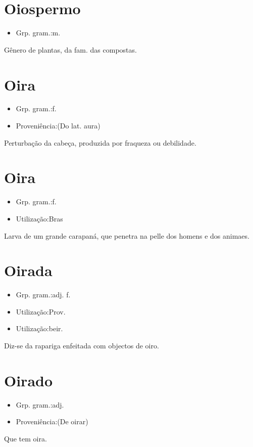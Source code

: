 \section{Oiospermo}
\begin{itemize}
\item {Grp. gram.:m.}
\end{itemize}
Gênero de plantas, da fam. das compostas.
\section{Oira}
\begin{itemize}
\item {Grp. gram.:f.}
\end{itemize}
\begin{itemize}
\item {Proveniência:(Do lat. \textunderscore aura\textunderscore )}
\end{itemize}
Perturbação da cabeça, produzida por fraqueza ou debilidade.
\section{Oira}
\begin{itemize}
\item {Grp. gram.:f.}
\end{itemize}
\begin{itemize}
\item {Utilização:Bras}
\end{itemize}
Larva de um grande carapaná, que penetra na pelle dos homens e dos animaes.
\section{Oirada}
\begin{itemize}
\item {Grp. gram.:adj. f.}
\end{itemize}
\begin{itemize}
\item {Utilização:Prov.}
\end{itemize}
\begin{itemize}
\item {Utilização:beir.}
\end{itemize}
Diz-se da rapariga enfeitada com objectos de oiro.
\section{Oirado}
\begin{itemize}
\item {Grp. gram.:adj.}
\end{itemize}
\begin{itemize}
\item {Proveniência:(De \textunderscore oirar\textunderscore )}
\end{itemize}
Que tem oira.
